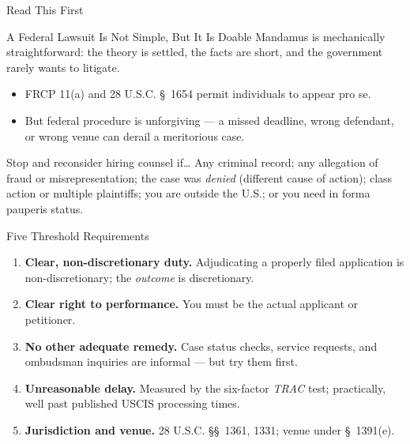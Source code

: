 \documentclass[aspectratio=169,11pt]{beamer}
\begin{document}
	\begin{frame}{Read This First}
		\begin{block}{A Federal Lawsuit Is Not Simple, But It Is Doable}
			Mandamus is mechanically straightforward: the theory is settled, the facts are short, and the government rarely wants to litigate.
		\end{block}
		\begin{itemize}
			\item FRCP 11(a) and 28 U.S.C. \S~1654 permit individuals to appear pro se.
			\item But federal procedure is unforgiving --- a missed deadline, wrong defendant, or wrong venue can derail a meritorious case.
		\end{itemize}
		\begin{alertblock}{Stop and reconsider hiring counsel if\ldots}
			\small Any criminal record; any allegation of fraud or misrepresentation; the case was \emph{denied} (different cause of action); class action or multiple plaintiffs; you are outside the U.S.; or you need in forma pauperis status.
		\end{alertblock}
	\end{frame}
	
	\begin{frame}{Five Threshold Requirements}
		\small
		\begin{enumerate}
			\item \textbf{Clear, non-discretionary duty.} Adjudicating a properly filed application is non-discretionary; the \emph{outcome} is discretionary.
			\item \textbf{Clear right to performance.} You must be the actual applicant or petitioner.
			\item \textbf{No other adequate remedy.} Case status checks, service requests, and ombudsman inquiries are informal --- but try them first.
			\item \textbf{Unreasonable delay.} Measured by the six-factor \emph{TRAC} test; practically, well past published USCIS processing times.
			\item \textbf{Jurisdiction and venue.} 28 U.S.C. \S\S~1361, 1331; venue under \S~1391(e).
		\end{enumerate}
	\end{frame}
	
\end{document}
